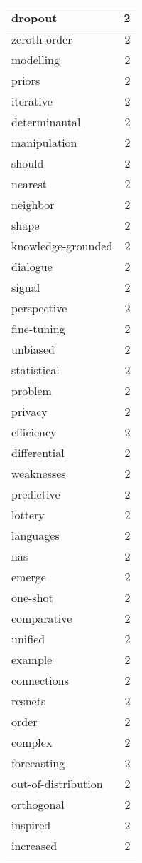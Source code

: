\begin{table}[h]
\begin{tabular}{|l|r|}
dropout & 2 \\
\hline
zeroth-order & 2 \\
\hline
modelling & 2 \\
\hline
priors & 2 \\
\hline
iterative & 2 \\
\hline
determinantal & 2 \\
\hline
manipulation & 2 \\
\hline
should & 2 \\
\hline
nearest & 2 \\
\hline
neighbor & 2 \\
\hline
shape & 2 \\
\hline
knowledge-grounded & 2 \\
\hline
dialogue & 2 \\
\hline
signal & 2 \\
\hline
perspective & 2 \\
\hline
fine-tuning & 2 \\
\hline
unbiased & 2 \\
\hline
statistical & 2 \\
\hline
problem & 2 \\
\hline
privacy & 2 \\
\hline
efficiency & 2 \\
\hline
differential & 2 \\
\hline
weaknesses & 2 \\
\hline
predictive & 2 \\
\hline
lottery & 2 \\
\hline
languages & 2 \\
\hline
nas & 2 \\
\hline
emerge & 2 \\
\hline
one-shot & 2 \\
\hline
comparative & 2 \\
\hline
unified & 2 \\
\hline
example & 2 \\
\hline
connections & 2 \\
\hline
resnets & 2 \\
\hline
order & 2 \\
\hline
complex & 2 \\
\hline
forecasting & 2 \\
\hline
out-of-distribution & 2 \\
\hline
orthogonal & 2 \\
\hline
inspired & 2 \\
\hline
increased & 2 \\

\end{tabular}
\end{table}
